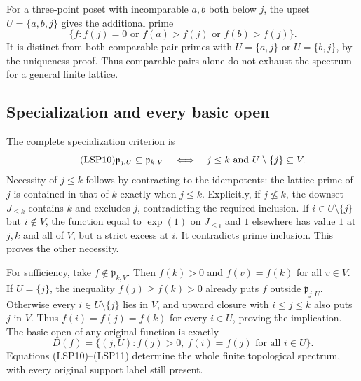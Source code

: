 For a three-point poset with incomparable $a,b$ both below $j$,
the upset $U=\{a,b,j\}$ gives the additional prime
\begin{equation}\tag{LSP9}
 \{f:f(j)=0\text{ or }f(a)>f(j)\text{ or }f(b)>f(j)\}.
\end{equation}
It is distinct from both comparable-pair primes with $U=\{a,j\}$
or $U=\{b,j\}$, by the uniqueness proof. Thus comparable pairs
alone do not exhaust the spectrum for a general finite lattice.

\subsection{Specialization and every basic open}

The complete specialization criterion is
\begin{equation}\tag{LSP10}
 \mathfrak p_{j,U}\subseteq\mathfrak p_{k,V}
 \quad\Longleftrightarrow\quad
 j\le k\ \hbox{and}\ U\setminus\{j\}\subseteq V.
\end{equation}
Necessity of $j\le k$ follows by contracting to the idempotents:
the lattice prime of $j$ is contained in that of $k$ exactly when
$j\le k$. Explicitly, if $j\nleq k$, the downset $J_{\le k}$
contains $k$ and excludes $j$, contradicting the required inclusion.
If $i\in U\setminus\{j\}$ but $i\notin V$, the function
equal to $\exp(1)$ on $J_{\le i}$ and $1$ elsewhere has value
$1$ at $j,k$ and all of $V$, but a strict excess at $i$.
It contradicts prime inclusion. This proves the other necessity.

For sufficiency, take $f\notin\mathfrak p_{k,V}$. Then $f(k)>0$
and $f(v)=f(k)$ for all $v\in V$. If $U=\{j\}$, the inequality
$f(j)\ge f(k)>0$ already puts $f$ outside $\mathfrak p_{j,U}$.
Otherwise every $i\in U\setminus\{j\}$ lies in $V$, and
upward closure with $i\le j\le k$ also puts $j$ in $V$.
Thus $f(i)=f(j)=f(k)$ for every $i\in U$, proving the implication.
The basic open of any original function is exactly
\begin{equation}\tag{LSP11}
 D(f)=\{(j,U):f(j)>0,\ f(i)=f(j)\text{ for all }i\in U\}.
\end{equation}
Equations (LSP10)--(LSP11) determine the whole finite topological
spectrum, with every original support label still present.


